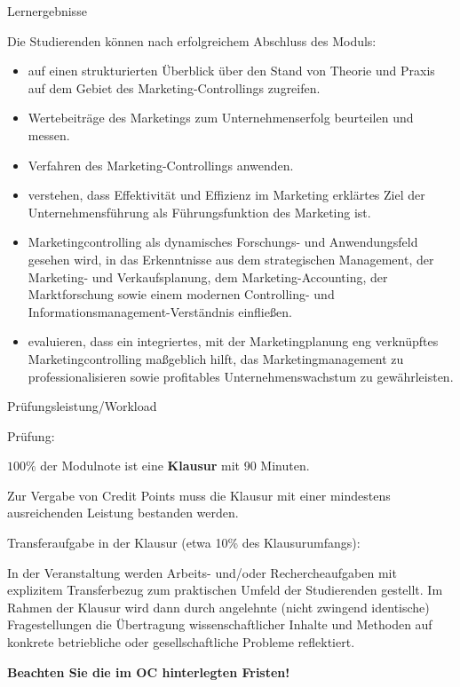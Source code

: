 \documentclass[12pt,ngerman,a4paper,ignorenonframetext,]{beamer}
\providecommand{\tightlist}{%
  \setlength{\itemsep}{0pt}\setlength{\parskip}{0pt}}
\begin{document}
\begin{frame}{Lernergebnisse}
\protect\hypertarget{lernergebnisse}{}

Die Studierenden können nach erfolgreichem Abschluss des Moduls:

\begin{itemize}
\tightlist
\item
  auf einen strukturierten Überblick über den Stand von Theorie und
  Praxis auf dem Gebiet des Marketing-Controllings zugreifen.
\item
  Wertebeiträge des Marketings zum Unternehmenserfolg beurteilen und
  messen.
\item
  Verfahren des Marketing-Controllings anwenden.
\item
  verstehen, dass Effektivität und Effizienz im Marketing erklärtes Ziel
  der Unternehmensführung als Führungsfunktion des Marketing ist.
\item
  Marketingcontrolling als dynamisches Forschungs- und Anwendungsfeld
  gesehen wird, in das Erkenntnisse aus dem strategischen Management,
  der Marketing- und Verkaufsplanung, dem Marketing-Accounting, der
  Marktforschung sowie einem modernen Controlling- und
  Informationsmanagement-Verständnis einfließen.
\item
  evaluieren, dass ein integriertes, mit der Marketingplanung eng
  verknüpftes Marketingcontrolling maßgeblich hilft, das
  Marketingmanagement zu professionalisieren sowie profitables
  Unternehmenswachstum zu gewährleisten.
\end{itemize}

\end{frame}

\begin{frame}{Prüfungsleistung\thinspace{}/\thinspace{}Workload}
\protect\hypertarget{prufungsleistung-workload}{}

Prüfung:

\(100\%\) der Modulnote ist eine \textbf{Klausur} mit 90 Minuten.

Zur Vergabe von Credit Points muss die Klausur mit einer mindestens
ausreichenden Leistung bestanden werden.

Transferaufgabe in der Klausur (etwa \mbox{10\thinspace{}\%}\xspace{}
des Klausurumfangs):

In der Veranstaltung werden Arbeits- und/oder Rechercheaufgaben mit
explizitem Transferbezug zum praktischen Umfeld der Studierenden
gestellt. Im Rahmen der Klausur wird dann durch angelehnte (nicht
zwingend identische) Fragestellungen die Übertragung wissenschaftlicher
Inhalte und Methoden auf konkrete betriebliche oder gesellschaftliche
Probleme reflektiert.

\textbf{Beachten Sie die im OC hinterlegten Fristen!}

\end{frame}
\end{document}
